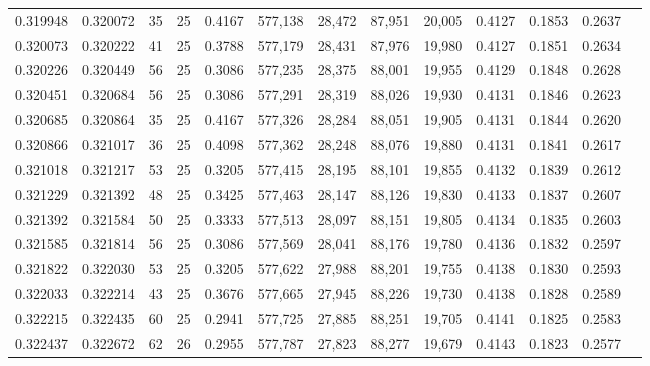 \begin{tabular}{rrrrrrrrrrrrr}
0.319948 & 0.320072 &    35 &  25 &                                     0.4167 & 577,138 &  28,472 &  87,951 &  20,005 & 0.4127 & 0.1853 & 0.2637 \\
0.320073 & 0.320222 &    41 &  25 &                                     0.3788 & 577,179 &  28,431 &  87,976 &  19,980 & 0.4127 & 0.1851 & 0.2634 \\
0.320226 & 0.320449 &    56 &  25 &                                     0.3086 & 577,235 &  28,375 &  88,001 &  19,955 & 0.4129 & 0.1848 & 0.2628 \\
0.320451 & 0.320684 &    56 &  25 &                                     0.3086 & 577,291 &  28,319 &  88,026 &  19,930 & 0.4131 & 0.1846 & 0.2623 \\
0.320685 & 0.320864 &    35 &  25 &                                     0.4167 & 577,326 &  28,284 &  88,051 &  19,905 & 0.4131 & 0.1844 & 0.2620 \\
0.320866 & 0.321017 &    36 &  25 &                                     0.4098 & 577,362 &  28,248 &  88,076 &  19,880 & 0.4131 & 0.1841 & 0.2617 \\
0.321018 & 0.321217 &    53 &  25 &                                     0.3205 & 577,415 &  28,195 &  88,101 &  19,855 & 0.4132 & 0.1839 & 0.2612 \\
0.321229 & 0.321392 &    48 &  25 &                                     0.3425 & 577,463 &  28,147 &  88,126 &  19,830 & 0.4133 & 0.1837 & 0.2607 \\
0.321392 & 0.321584 &    50 &  25 &                                     0.3333 & 577,513 &  28,097 &  88,151 &  19,805 & 0.4134 & 0.1835 & 0.2603 \\
0.321585 & 0.321814 &    56 &  25 &                                     0.3086 & 577,569 &  28,041 &  88,176 &  19,780 & 0.4136 & 0.1832 & 0.2597 \\
0.321822 & 0.322030 &    53 &  25 &                                     0.3205 & 577,622 &  27,988 &  88,201 &  19,755 & 0.4138 & 0.1830 & 0.2593 \\
0.322033 & 0.322214 &    43 &  25 &                                     0.3676 & 577,665 &  27,945 &  88,226 &  19,730 & 0.4138 & 0.1828 & 0.2589 \\
0.322215 & 0.322435 &    60 &  25 &                                     0.2941 & 577,725 &  27,885 &  88,251 &  19,705 & 0.4141 & 0.1825 & 0.2583 \\
0.322437 & 0.322672 &    62 &  26 &                                     0.2955 & 577,787 &  27,823 &  88,277 &  19,679 & 0.4143 & 0.1823 & 0.2577 \\

\end{tabular}
